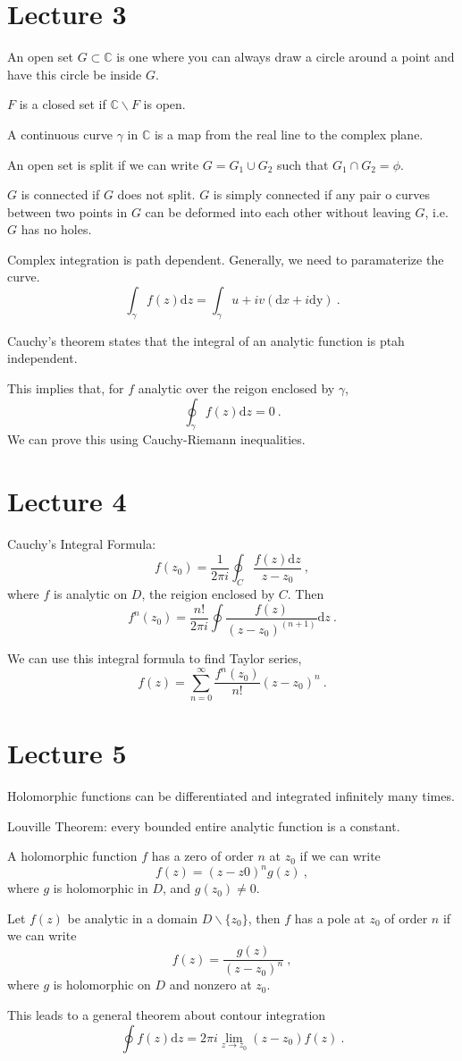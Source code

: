 \documentclass[11pt, a4paper]{report}
\begin{document}
\section{Lecture 3}

An open set $G\subset\mathbb{C}$ is one where you can always draw a circle around a point and have this circle be inside $G$.

$F$ is a closed set if $\mathbb{C}\backslash F$ is open.

A continuous curve $\gamma$ in $\mathbb{C}$ is a map from the real line to the complex plane.

An open set is split if we can write $G = G_1 \cup G_2$ such that $G_1 \cap G_2 = \phi$.

$G$ is connected if $G$ does not split.
$G$ is simply connected if any pair o curves between two points in $G$ can be deformed into each other without leaving $G$, i.e. $G$ has no holes.

Complex integration is path dependent. 
Generally, we need to paramaterize the curve.
$$
	\int_\gamma f(z)\mathrm{d}z = \int_\gamma u+iv(\mathrm{d}x + i\mathrm{dy})~.
$$

Cauchy's theorem states that the integral of an analytic function is ptah independent.

This implies that, for $f$ analytic over the reigon enclosed by $\gamma$,
$$
	\oint_\gamma f(z)\mathrm{d}z = 0~.
$$
We can prove this using Cauchy-Riemann inequalities.

\section{Lecture 4}

Cauchy's Integral Formula:
$$
	f(z_0) = \frac{1}{2\pi i} \oint_C \frac{f(z)\mathrm{d}z}{z-z_0}~,
$$
where $f$ is analytic on $D$, the reigion enclosed by $C$. Then
$$
f^n(z_0) = \frac{n!}{2\pi i} \oint \frac{f(z)}{(z-z_0)^(n+1)} \mathrm{d}z~.
$$

We can use this integral formula to find Taylor series,
$$
	f(z) = \sum_{n=0}^\infty \frac{f^n(z_0)}{n!}(z-z_0)^n~.
$$


\section{Lecture 5}

Holomorphic functions can be differentiated and integrated infinitely many times.

Louville Theorem: every bounded entire analytic function is a constant.

A holomorphic function $f$ has a zero of order $n$ at $z_0$ if we can write
$$
	f(z) = (z-z0)^ng(z)~,
$$
where $g$ is holomorphic in $D$, and $g(z_0) \neq 0$.

Let $f(z)$ be analytic in a domain $D \backslash \{z_0\}$, then $f$ has a pole at $z_0$ of order $n$ if we can write
$$
	f(z) = \frac{g(z)}{(z-z_0)^n}~,
$$
where $g$ is holomorphic on $D$ and nonzero at $z_0$.

This leads to a general theorem about contour integration
$$
	\oint f(z) \mathrm{d}z = 2\pi i \lim_{z\rightarrow z_0} (z-z_0)f(z)~.
$$
\end{document}

